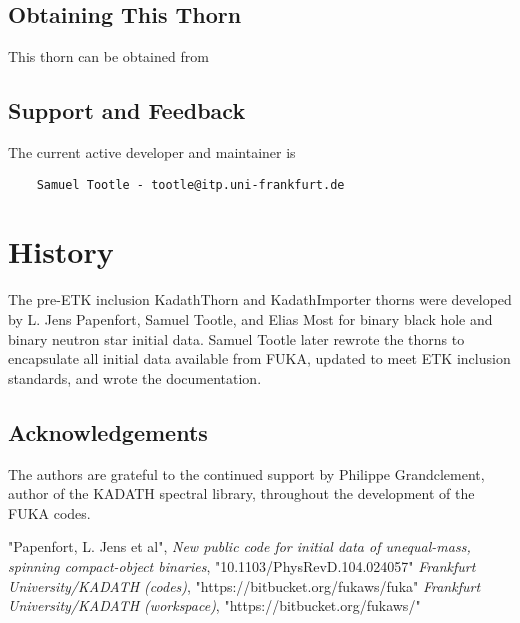 \subsection{Obtaining This Thorn}
This thorn can be obtained from \cite{fukaws}

\subsection{Support and Feedback}
The current active developer and maintainer is
\begin{verbatim}
    Samuel Tootle - tootle@itp.uni-frankfurt.de
\end{verbatim}

\section{History}
The pre-ETK inclusion KadathThorn and KadathImporter thorns were developed by L. Jens Papenfort, 
Samuel Tootle, and Elias Most for binary black hole and binary neutron star initial data. 
Samuel Tootle later rewrote the thorns to encapsulate all initial data available
from FUKA, updated to meet ETK inclusion standards, and wrote the documentation.

\subsection{Acknowledgements}
The authors are grateful to the continued support by Philippe Grandclement, author of
the KADATH spectral library, throughout the development of the FUKA codes.

\begin{thebibliography}{9}
    "Papenfort, L. Jens et al", \emph{New public code for initial data of unequal-mass, spinning compact-object binaries},
        "10.1103/PhysRevD.104.024057"
    \emph{Frankfurt University/KADATH (codes)}, "{https://bitbucket.org/fukaws/fuka}"
    \emph{Frankfurt University/KADATH (workspace)}, "{https://bitbucket.org/fukaws/}"

\end{thebibliography}




